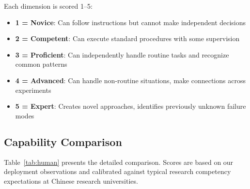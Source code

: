 \documentclass[11pt,a4paper]{article}
\begin{document}
Each dimension is scored 1--5:
\begin{itemize}[nosep]
\item \textbf{1 = Novice}: Can follow instructions but cannot make independent decisions
\item \textbf{2 = Competent}: Can execute standard procedures with some supervision
\item \textbf{3 = Proficient}: Can independently handle routine tasks and recognize common patterns
\item \textbf{4 = Advanced}: Can handle non-routine situations, make connections across experiments
\item \textbf{5 = Expert}: Creates novel approaches, identifies previously unknown failure modes
\end{itemize}

\subsection{Capability Comparison}

Table~\ref{tab:human} presents the detailed comparison.
Scores are based on our deployment observations and calibrated against typical research competency expectations at Chinese research universities.
\end{document}
